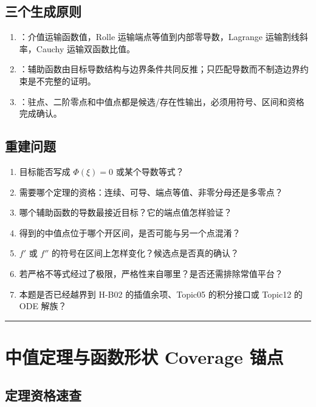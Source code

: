 \documentclass[UTF8,fontset=none,11pt,a4paper]{ctexart}
\begin{document}
\subsection{三个生成原则}
\begin{enumerate}
  \item {}：介值运输函数值，Rolle 运输端点等值到内部零导数，Lagrange 运输割线斜率，Cauchy 运输双函数比值。
  \item {}：辅助函数由目标导数结构与边界条件共同反推；只匹配导数而不制造边界约束是不完整的证明。
  \item {}：驻点、二阶零点和中值点都是候选/存在性输出，必须用符号、区间和资格完成确认。
\end{enumerate}

\subsection{重建问题}
\begin{enumerate}
  \item 目标能否写成 $\Phi(\xi)=0$ 或某个导数等式？
  \item 需要哪个定理的资格：连续、可导、端点等值、非零分母还是多零点？
  \item 哪个辅助函数的导数最接近目标？它的端点值怎样验证？
  \item 得到的中值点位于哪个开区间，是否可能与另一个点混淆？
  \item $f'$ 或 $f''$ 的符号在区间上怎样变化？候选点是否真的确认？
  \item 若严格不等式经过了极限，严格性来自哪里？是否还需排除常值平台？
  \item 本题是否已经越界到 H-B02 的插值余项、Topic05 的积分接口或 Topic12 的 ODE 解族？
\end{enumerate}

\begin{center}\rule{0.5\linewidth}{0.5pt}\end{center}

\appendix
\section{中值定理与函数形状 Coverage 锚点}

\subsection{定理资格速查}
\end{document}
